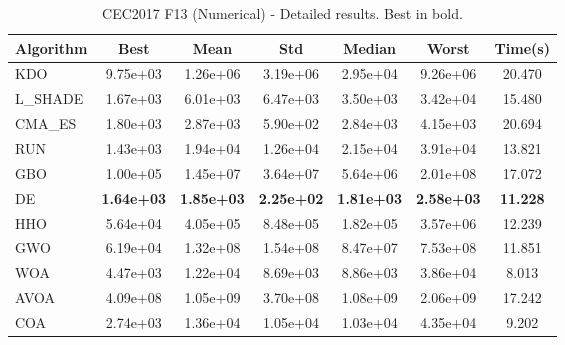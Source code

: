 \begin{table}[H]
\centering\small
\caption{CEC2017 F13 (Numerical) - Detailed results. Best in bold.}
\label{tab:cec2017_F13}
\begin{tabular}{lcccccc}
\toprule
\textbf{Algorithm} & \textbf{Best} & \textbf{Mean} & \textbf{Std} & \textbf{Median} & \textbf{Worst} & \textbf{Time(s)} \\
\midrule
KDO & 9.75e+03 & 1.26e+06 & 3.19e+06 & 2.95e+04 & 9.26e+06 & 20.470 \\
L_SHADE & 1.67e+03 & 6.01e+03 & 6.47e+03 & 3.50e+03 & 3.42e+04 & 15.480 \\
CMA_ES & 1.80e+03 & 2.87e+03 & 5.90e+02 & 2.84e+03 & 4.15e+03 & 20.694 \\
RUN & 1.43e+03 & 1.94e+04 & 1.26e+04 & 2.15e+04 & 3.91e+04 & 13.821 \\
GBO & 1.00e+05 & 1.45e+07 & 3.64e+07 & 5.64e+06 & 2.01e+08 & 17.072 \\
DE & \textbf{1.64e+03} & \textbf{1.85e+03} & \textbf{2.25e+02} & \textbf{1.81e+03} & \textbf{2.58e+03} & \textbf{11.228} \\
HHO & 5.64e+04 & 4.05e+05 & 8.48e+05 & 1.82e+05 & 3.57e+06 & 12.239 \\
GWO & 6.19e+04 & 1.32e+08 & 1.54e+08 & 8.47e+07 & 7.53e+08 & 11.851 \\
WOA & 4.47e+03 & 1.22e+04 & 8.69e+03 & 8.86e+03 & 3.86e+04 & 8.013 \\
AVOA & 4.09e+08 & 1.05e+09 & 3.70e+08 & 1.08e+09 & 2.06e+09 & 17.242 \\
COA & 2.74e+03 & 1.36e+04 & 1.05e+04 & 1.03e+04 & 4.35e+04 & 9.202 \\
\bottomrule
\end{tabular}
\end{table}
